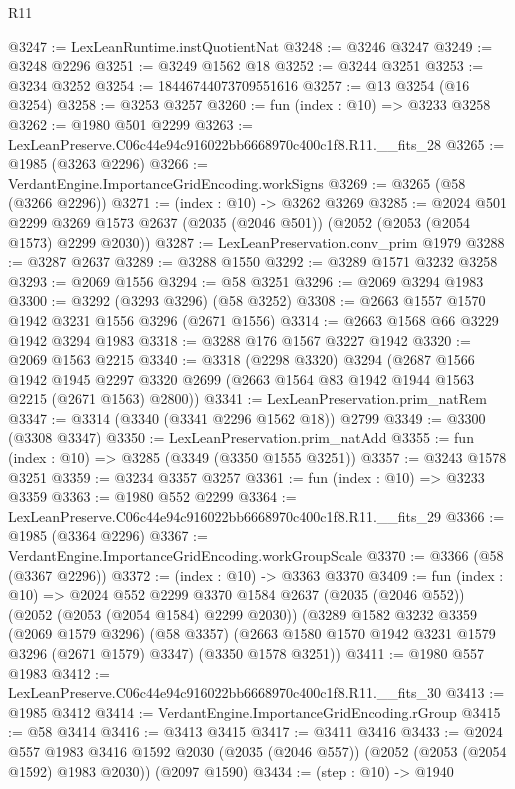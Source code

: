 \begin{lexlean}{R11}
\begin{coremodule}
@3247 := LexLeanRuntime.instQuotientNat
@3248 := @3246 @3247
@3249 := @3248 @2296
@3251 := @3249 @1562 @18
@3252 := @3244 @3251
@3253 := @3234 @3252
@3254 := 18446744073709551616
@3257 := @13 @3254 (@16 @3254)
@3258 := @3253 @3257
@3260 := fun (index : @10) => @3233 @3258
@3262 := @1980 @501 @2299
@3263 := LexLeanPreserve.C06c44e94c916022bb6668970c400c1f8.R11.__fits_28
@3265 := @1985 (@3263 @2296)
@3266 := VerdantEngine.ImportanceGridEncoding.workSigns
@3269 := @3265 (@58 (@3266 @2296))
@3271 := (index : @10) -> @3262 @3269
@3285 := @2024
    @501
    @2299
    @3269
    @1573
    @2637
    (@2035 (@2046 @501))
    (@2052 (@2053 (@2054 @1573) @2299 @2030))
@3287 := LexLeanPreservation.conv_prim @1979
@3288 := @3287 @2637
@3289 := @3288 @1550
@3292 := @3289 @1571 @3232 @3258
@3293 := @2069 @1556
@3294 := @58 @3251
@3296 := @2069 @3294 @1983
@3300 := @3292 (@3293 @3296) (@58 @3252)
@3308 := @2663 @1557 @1570 @1942 @3231 @1556 @3296 (@2671 @1556)
@3314 := @2663 @1568 @66 @3229 @1942 @3294 @1983
@3318 := @3288 @176 @1567 @3227 @1942
@3320 := @2069 @1563 @2215
@3340 := @3318
    (@2298 @3320)
    @3294
    (@2687
      @1566
      @1942
      @1945
      @2297
      @3320
      @2699
      (@2663 @1564 @83 @1942 @1944 @1563 @2215 (@2671 @1563) @2800))
@3341 := LexLeanPreservation.prim_natRem
@3347 := @3314 (@3340 (@3341 @2296 @1562 @18)) @2799
@3349 := @3300 (@3308 @3347)
@3350 := LexLeanPreservation.prim_natAdd
@3355 := fun (index : @10) => @3285 (@3349 (@3350 @1555 @3251))
@3357 := @3243 @1578 @3251
@3359 := @3234 @3357 @3257
@3361 := fun (index : @10) => @3233 @3359
@3363 := @1980 @552 @2299
@3364 := LexLeanPreserve.C06c44e94c916022bb6668970c400c1f8.R11.__fits_29
@3366 := @1985 (@3364 @2296)
@3367 := VerdantEngine.ImportanceGridEncoding.workGroupScale
@3370 := @3366 (@58 (@3367 @2296))
@3372 := (index : @10) -> @3363 @3370
@3409 := fun (index : @10) =>
  @2024
    @552
    @2299
    @3370
    @1584
    @2637
    (@2035 (@2046 @552))
    (@2052 (@2053 (@2054 @1584) @2299 @2030))
    (@3289
      @1582
      @3232
      @3359
      (@2069 @1579 @3296)
      (@58 @3357)
      (@2663 @1580 @1570 @1942 @3231 @1579 @3296 (@2671 @1579) @3347)
      (@3350 @1578 @3251))
@3411 := @1980 @557 @1983
@3412 := LexLeanPreserve.C06c44e94c916022bb6668970c400c1f8.R11.__fits_30
@3413 := @1985 @3412
@3414 := VerdantEngine.ImportanceGridEncoding.rGroup
@3415 := @58 @3414
@3416 := @3413 @3415
@3417 := @3411 @3416
@3433 := @2024
    @557
    @1983
    @3416
    @1592
    @2030
    (@2035 (@2046 @557))
    (@2052 (@2053 (@2054 @1592) @1983 @2030))
    (@2097 @1590)
@3434 := (step : @10) -> @1940

\end{coremodule}
\end{lexlean}
